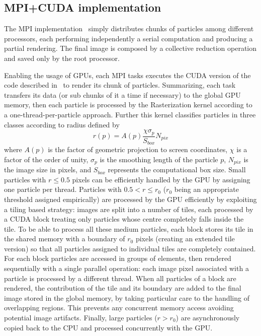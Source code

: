 \documentclass{egpubl}
\begin{document}
\subsection{MPI+CUDA implementation}
The MPI implementation~\cite{JKR*10} simply distributes chunks of particles among different processors, each performing independently a serial computation and producing a partial rendering. The final image is composed by a collective reduction operation and saved only by the root processor.

Enabling the usage of GPUs, each MPI tasks executes the CUDA version of the code described in~\cite{RGD*14} to render its chunk of particles. 
Summarizing, each task transfers its data (or sub chunks of it a time if necessary) to the global GPU memory, then each particle is processed by the Rasterization kernel according to a one-thread-per-particle approach. Further this kernel classifies particles in three classes according to radius defined by
\begin{equation}
r(p) = A(p)\frac{\chi \sigma_p}{S_{box}}N_{pix} 
\end{equation}
where $A(p)$ is the factor of geometric projection to screen coordinates, $\chi$ is a factor of the order of unity, $\sigma_p$ is the smoothing length of the particle $p$, $N_{pix}$ is the image size in pixels, and $S_{box}$ represents the computational box size. Small particles with $r \le 0.5$ pixels can be efficiently handled by the GPU by assigning one particle per thread. Particles with $0.5 < r \le r_0$ ($r_0$ being an appropriate threshold assigned empirically) are processed by the GPU efficiently by exploiting a tiling based strategy: images are split into a number of tiles, each processed by a CUDA block treating only particles whose centre completely falls inside the tile. To be able to process all these medium particles, each block stores its tile in the shared memory with a boundary of $r_0$ pixels (creating an extended tile version) so that all particles assigned to individual tiles are completely contained. For each block particles are accessed in groups of elements, then rendered sequentially with a single parallel operation: each image pixel associated with a particle is processed by a different thread. When all particles of a block are rendered, the contribution of the tile and its boundary are added to the final image stored in the global memory, by taking particular care to the handling of overlapping regions. This prevents any concurrent memory access avoiding potential image artifacts. Finally, large particles ($r>r_0$) are asynchronously copied back to the CPU and processed concurrently with the GPU.
\end{document}
